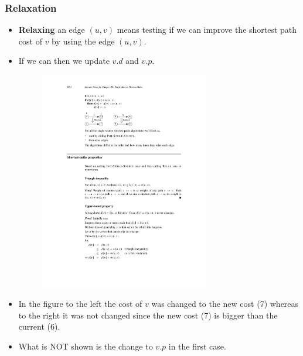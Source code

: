 \documentclass{beamer}
\begin{document}
\begin{frame}
  \frametitle{Relaxation}
  \begin{itemize}
  \item \textbf{Relaxing} an edge $(u,v)$ means testing if we can
    improve the shortest path cost of $v$ by using the edge $(u,v)$.
  \item If we can then we update $v.d$ and $v.p$.
    \begin{figure}[h]
      \centering
      \includegraphics[width=0.7\textwidth]{greedy-figs/relax.pdf}
    \end{figure}
\item In the figure to the left the cost of $v$ was changed to the new
  cost (7) whereas to the right it was not changed since the new cost
  (7) is bigger than the current (6).
\item What is NOT shown is the change to $v.p$ in the first case.
  \end{itemize}
\end{frame}
\end{document}
